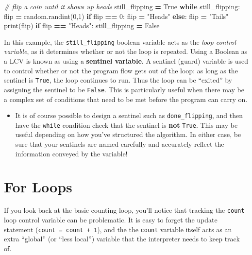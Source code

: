 \documentclass[]{book}
\newenvironment{Shaded}{\begin{snugshade}}{\end{snugshade}}
\newcommand{\DecValTok}[1]{\textcolor[rgb]{0.00,0.00,0.81}{#1}}
\newcommand{\StringTok}[1]{\textcolor[rgb]{0.31,0.60,0.02}{#1}}
\newcommand{\CommentTok}[1]{\textcolor[rgb]{0.56,0.35,0.01}{\textit{#1}}}
\newcommand{\VariableTok}[1]{\textcolor[rgb]{0.00,0.00,0.00}{#1}}
\newcommand{\ControlFlowTok}[1]{\textcolor[rgb]{0.13,0.29,0.53}{\textbf{#1}}}
\newcommand{\OperatorTok}[1]{\textcolor[rgb]{0.81,0.36,0.00}{\textbf{#1}}}
\newcommand{\BuiltInTok}[1]{#1}
\newcommand{\NormalTok}[1]{#1}
\providecommand{\tightlist}{%
  \setlength{\itemsep}{0pt}\setlength{\parskip}{0pt}}
\begin{document}
\begin{Shaded}
\begin{Highlighting}[]
\CommentTok{# flip a coin until it shows up heads}
\NormalTok{still_flipping }\OperatorTok{=} \VariableTok{True}
\ControlFlowTok{while}\NormalTok{ still_flipping:}
\NormalTok{    flip }\OperatorTok{=}\NormalTok{ random.randint(}\DecValTok{0}\NormalTok{,}\DecValTok{1}\NormalTok{)}
    \ControlFlowTok{if}\NormalTok{ flip }\OperatorTok{==} \DecValTok{0}\NormalTok{:}
\NormalTok{        flip }\OperatorTok{=} \StringTok{"Heads"}
    \ControlFlowTok{else}\NormalTok{:}
\NormalTok{        flip }\OperatorTok{=} \StringTok{"Tails"}
    \BuiltInTok{print}\NormalTok{(flip)}
    \ControlFlowTok{if}\NormalTok{ flip }\OperatorTok{==} \StringTok{"Heads"}\NormalTok{:}
\NormalTok{        still_flipping }\OperatorTok{=} \VariableTok{False}
\end{Highlighting}
\end{Shaded}

In this example, the \texttt{still\_flipping} boolean variable acts as
the \emph{loop control variable}, as it determines whether or not the
loop is repeated. Using a Boolean as a LCV is known as using a
\textbf{sentinel variable}. A sentinel (guard) variable is used to
control whether or not the program flow gets out of the loop: as long as
the sentinel is \texttt{True}, the loop continues to run. Thus the loop
can be ``exited'' by assigning the sentinel to be \texttt{False}. This
is particularly useful when there may be a complex set of conditions
that need to be met before the program can carry on.

\begin{itemize}
\tightlist
\item
  It is of course possible to design a sentinel such as
  \texttt{done\_flipping}, and then have the \texttt{while} condition
  check that the sentinel is \textbf{not} \texttt{True}. This may be
  useful depending on how you've structured the algorithm. In either
  case, be sure that your sentinels are named carefully and accurately
  reflect the information conveyed by the variable!
\end{itemize}

\hypertarget{for-loops}{\section{For Loops}\label{for-loops}}

If you look back at the basic counting loop, you'll notice that tracking
the \texttt{count} loop control variable can be problematic. It is easy
to forget the update statement (\texttt{count\ =\ count\ +\ 1}), and the
the \texttt{count} variable itself acts as an extra ``global'' (or
``less local'') variable that the interpreter needs to keep track of.
\end{document}
